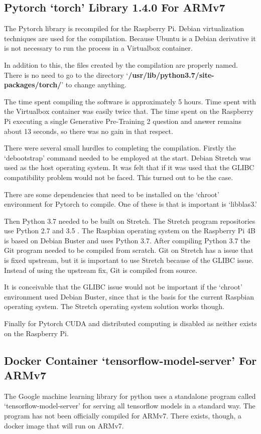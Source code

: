 \subsection{Pytorch `torch' Library 1.4.0 For ARMv7}
The Pytorch library is recompiled for the Raspberry Pi. Debian virtualization techniques are used for the compilation. Because Ubuntu is a Debian derivative it is not necessary to run the process in a Virtualbox container. 

In addition to this, the files created by the compilation are properly named. There is no need to go to the directory `\textbf{/usr/lib/python3.7/site-packages/torch/}' to change anything. 

The time spent compiling the software is approximately 5 hours. Time spent with the Virtualbox container was easily twice that. The time spent on the Raspberry Pi executing a single Generative Pre-Training 2 question and answer remains about 13 seconds, so there was no gain in that respect.

There were several small hurdles to completing the compilation. Firstly the `debootstrap' command needed to be employed at the start. Debian Stretch was used as the host operating system. It was felt that if it was used that the GLIBC compatibility problem would not be faced. This turned out to be the case.

There are some dependencies that need to be installed on the `chroot' environment for Pytorch to compile. One of these is that is important is `libblas3.'

Then Python 3.7 needed to be built on Stretch. The Stretch program repositories use Python 2.7 and 3.5 . The Raspbian operating system on the Raspberry Pi 4B is based on Debian Buster and uses Python 3.7. After compiling Python 3.7 the Git program needed to be compiled from scratch. Git on Stretch has a issue that is fixed upstream, but it is important to use Stretch because of the GLIBC issue. Instead of using the upstream fix, Git is compiled from source. 

It is conceivable that the GLIBC issue would not be important if the `chroot' environment used Debian Buster, since that is the basis for the current Raspbian operating system. The Stretch operating system solution works though.

Finally for Pytorch CUDA and distributed computing is disabled as neither exists on the Raspberry Pi.

\subsection{Docker Container `tensorflow-model-server' For ARMv7}
The Google machine learning library for python uses a standalone program called `tensorflow-model-server' for serving all tensorflow models in a standard way. The program has not been officially compiled for ARMv7. There exists, though, a docker image that will run on ARMv7.


